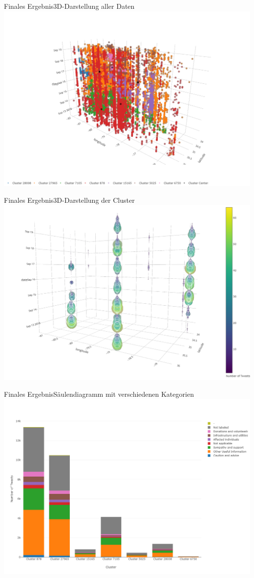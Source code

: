 \documentclass[12pt, xcolor={usenames,dvipsnames,svgnames,x11names,table}]{beamer}
\begin{document}
	\begin{frame}{Finales Ergebnis}{3D-Darstellung aller Daten}
		\center\includegraphics[width=.9\textwidth, clip=true, trim=0mm 0mm 0mm 50mm]{twitter_3d}
	\end{frame}
	
	\begin{frame}{Finales Ergebnis}{3D-Darstellung der Cluster}
		\center\includegraphics[width=.8\textwidth, clip=true, trim=0mm 0mm 0mm 0mm]{twitter_3d_cluster_700}
	\end{frame}
	
	\begin{frame}{Finales Ergebnis}{Säulendiagramm mit verschiedenen Kategorien}
		\center\includegraphics[width=.9\textwidth, clip=true, trim=0mm 0mm 0mm 30mm]{twitter_bar_info_class}
	\end{frame}
	
\end{document}
